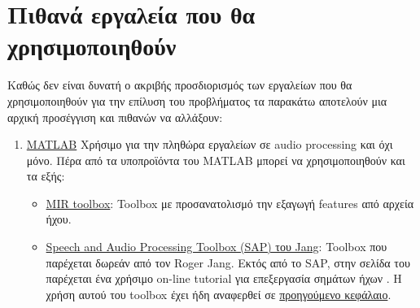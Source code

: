 \section{Πιθανά εργαλεία που θα χρησιμοποιηθούν}
Καθώς δεν είναι δυνατή ο ακριβής προσδιορισμός των εργαλείων που θα χρησιμοποιηθούν για την επίλυση του προβλήματος τα παρακάτω αποτελούν μια αρχική προσέγγιση και πιθανών να αλλάξουν:
\begin{enumerate}
    \item \href{https://www.mathworks.com/products/matlab/}{MATLAB}
    Χρήσιμο για την πληθώρα εργαλείων σε audio processing και όχι μόνο.
    Πέρα από τα υποπροϊόντα του MATLAB μπορεί να χρησιμοποιηθούν και τα εξής:
    \begin{itemize}
        \item \href{https://www.jyu.fi/hum/laitokset/musiikki/en/research/coe/materials/mirtoolbox}{MIR toolbox}:
        Toolbox με προσανατολισμό την εξαγωγή features από αρχεία ήχου.
        \item \href{http://mirlab.org/jang/matlab/toolbox/sap/}{Speech and Audio Processing Toolbox (SAP) του Jang}:
        Toolbox που παρέχεται δωρεάν από τον Roger Jang.
        Εκτός από το SAP, στην σελίδα του παρέχεται ένα χρήσιμο on-line tutorial για επεξεργασία σημάτων ήχων \cite{jang2011audio}.
        Η χρήση αυτού του toolbox έχει ήδη αναφερθεί σε \hyperref[pve:SAP]{προηγούμενο κεφάλαιο}.
    \end{itemize}


\end{enumerate}
